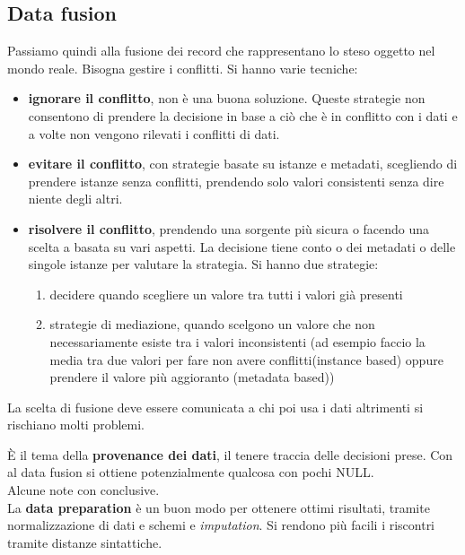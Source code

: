 \subsection{Data fusion}
Passiamo quindi alla fusione dei record che rappresentano lo steso oggetto nel mondo reale. Bisogna gestire i conflitti. Si hanno varie tecniche:
\begin{itemize}
    \item \textbf{ignorare il conflitto}, non è una buona soluzione. Queste strategie non consentono di prendere la decisione in base a ciò che è in conflitto con i dati e a volte non vengono rilevati i conflitti di dati.
    \item \textbf{evitare il conflitto}, con strategie basate su istanze e metadati, scegliendo di prendere istanze senza conflitti, prendendo solo valori consistenti senza dire niente degli altri.
    \item \textbf{risolvere il conflitto}, prendendo una sorgente più sicura o facendo una scelta a basata su vari aspetti. La decisione tiene conto o dei metadati o delle singole istanze per valutare la strategia. Si hanno due strategie:
        \begin{enumerate}
        \item decidere quando scegliere un valore tra tutti i valori già presenti
        \item strategie di mediazione, quando scelgono un valore che non necessariamente esiste tra i valori inconsistenti (ad esempio faccio la media tra due valori per fare non avere conflitti(instance based) oppure prendere il valore più aggioranto (metadata based))
    \end{enumerate}
\end{itemize}
La scelta di fusione deve essere comunicata a chi poi usa i dati altrimenti si rischiano molti problemi. 

È il tema della \textbf{provenance dei dati}, il tenere traccia delle decisioni prese. Con al data fusion si ottiene potenzialmente qualcosa con pochi NULL.\\ Alcune note con conclusive.\\ La \textbf{data preparation} è un buon modo per ottenere ottimi risultati, tramite normalizzazione di dati e schemi e \textit{imputation}. Si rendono più facili i riscontri tramite distanze sintattiche.